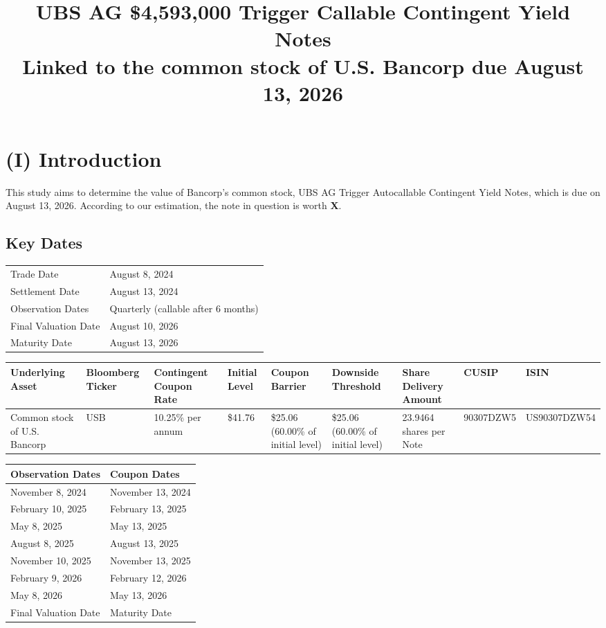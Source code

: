 \documentclass[12pt]{article}
\title{\textcolor{ubsblue}{\textbf{UBS AG \$4,593,000 Trigger Callable Contingent Yield Notes}\\
\textbf{Linked to the common stock of U.S. Bancorp due August 13, 2026}}}
\date{}
\begin{document}
\maketitle

\section*{(I) Introduction}
This study aims to determine the value of Bancorp's common stock, UBS AG Trigger Autocallable Contingent Yield Notes, which is due on August 13, 2026. According to our estimation, the note in question is worth \textbf{X}.

\subsection*{Key Dates}
\begin{table}[h]
\begin{tabular}{ll}
\toprule
Trade Date & August 8, 2024 \\
Settlement Date & August 13, 2024 \\
Observation Dates & Quarterly (callable after 6 months) \\
Final Valuation Date & August 10, 2026 \\
Maturity Date & August 13, 2026 \\
\bottomrule
\end{tabular}
\end{table}

\begin{table}[h]
\small
\begin{tabular}{p{2cm}p{1.5cm}p{1.5cm}p{1.5cm}p{1.5cm}p{1.5cm}p{1.5cm}p{1.5cm}p{2cm}}
\toprule
Underlying Asset & Bloomberg Ticker & Contingent Coupon Rate & Initial Level & Coupon Barrier & Downside Threshold & Share Delivery Amount & CUSIP & ISIN \\
\midrule
Common stock of U.S. Bancorp & USB & 10.25\% per annum & \$41.76 & \$25.06 (60.00\% of initial level) & \$25.06 (60.00\% of initial level) & 23.9464 shares per Note & 90307DZW5 & US90307DZW54 \\
\bottomrule
\end{tabular}
\end{table}

\begin{table}[h]
\begin{tabular}{ll}
\toprule
Observation Dates & Coupon Dates \\
\midrule
November 8, 2024 & November 13, 2024 \\
February 10, 2025 & February 13, 2025 \\
May 8, 2025 & May 13, 2025 \\
August 8, 2025 & August 13, 2025 \\
November 10, 2025 & November 13, 2025 \\
February 9, 2026 & February 12, 2026 \\
May 8, 2026 & May 13, 2026 \\
Final Valuation Date & Maturity Date \\
\bottomrule
\end{tabular}
\end{table}
\end{document}
